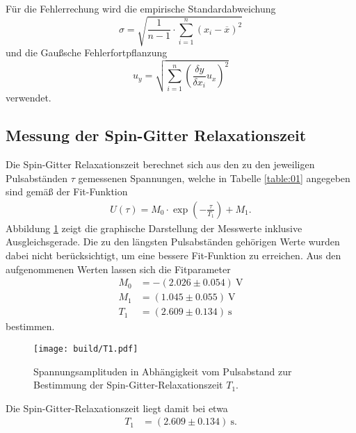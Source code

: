 \noindent Für die Fehlerrechung wird die empirische Standardabweichung
\begin{equation}
  \sigma = \sqrt{\frac{1}{n-1} \cdot \sum_{i=1}^n(x_i-\overline{x})^2}
  \label{eqn:Stdabweichung}
\end{equation}
und die Gaußsche Fehlerfortpflanzung
\begin{equation}
  u_y = \sqrt{\sum_{i=1}^n\left(\frac{\delta y}{\delta x_i}u_x\right)^2}
  \label{eqn:gauß}
\end{equation}
verwendet.
\subsection{Messung der Spin-Gitter Relaxationszeit}
\noindent Die Spin-Gitter Relaxationszeit berechnet sich aus den zu den
jeweiligen Pulsabständen $\tau$ gemessenen Spannungen, welche in Tabelle
\ref{table:01} angegeben sind gemäß der Fit-Funktion
\begin{align}
  U(\tau) = M_0 \cdot \exp{\left(- \frac{\tau}{T_1}\right)} + M_1.
  \label{eqn:03}
\end{align}
\noindent Abbildung \ref{fig:01} zeigt die graphische Darstellung der Messwerte
inklusive Ausgleichsgerade. Die zu den längsten Pulsabständen gehörigen Werte
wurden dabei nicht berücksichtigt, um eine bessere Fit-Funktion zu erreichen.
Aus den aufgenommenen Werten lassen sich die Fitparameter
\begin{align*}
  M_0 &=  -(2.026  \pm  0.054) \: \si{\volt} \\
  M_1 &=  (1.045 \pm  0.055) \: \si{\volt} \\
  T_1 &=  (2.609  \pm  0.134) \: \si{\second}
\end{align*}
\noindent bestimmen.
\FloatBarrier

\FloatBarrier
\FloatBarrier
\begin{figure}
  \texttt{[image: build/T1.pdf]}
  \caption{Spannungsamplituden in Abhängigkeit vom Pulsabstand zur Bestimmung
           der Spin-Gitter-Relaxationszeit $T_1$.}
  \label{fig:01}
\end{figure}
\FloatBarrier
\noindent Die Spin-Gitter-Relaxationszeit liegt damit bei etwa
\begin{align*}
  T_1 &=  (2.609  \pm  0.134) \: \si{\second}.
\end{align*}
